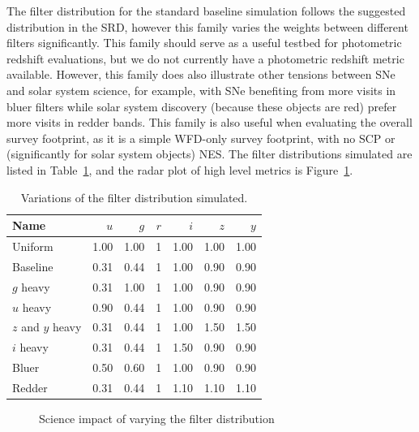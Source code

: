 The filter distribution for the standard baseline simulation follows the suggested distribution in the SRD, however this family varies the weights between different filters significantly. This family should serve as a useful testbed for photometric redshift evaluations, but we do not currently have a photometric redshift metric available. However, this family does also illustrate other tensions between SNe and solar system science, for example, with SNe benefiting from more visits in bluer filters while solar system discovery (because these objects are red) prefer more visits in redder bands. This family is also useful when evaluating the overall survey footprint, as it is a simple WFD-only survey footprint, with no SCP or (significantly for solar system objects) NES. 
The filter distributions simulated are listed in Table~\ref{table:filtdist}, and the radar plot of high level metrics is Figure~\ref{fig:filterdist_radar}. 

\begin{table}
\begin{centering}
\begin{tabular}{lrrrrrr}
              Name &     $u$ &     $g$ &  $r$ &     $i$ &     $z$ &     $y$ \\
\hline
           Uniform & 1.00 & 1.00 &  1 & 1.00 & 1.00 & 1.00 \\
          Baseline & 0.31 & 0.44 &  1 & 1.00 & 0.90 & 0.90 \\
         $g$ heavy & 0.31 & 1.00 &  1 & 1.00 & 0.90 & 0.90 \\
         $u$ heavy & 0.90 & 0.44 &  1 & 1.00 & 0.90 & 0.90 \\
        $z$ and $y$ heavy & 0.31 & 0.44 &  1 & 1.00 & 1.50 & 1.50 \\
         $i$ heavy & 0.31 & 0.44 &  1 & 1.50 & 0.90 & 0.90 \\
             Bluer & 0.50 & 0.60 &  1 & 1.00 & 0.90 & 0.90 \\
            Redder & 0.31 & 0.44 &  1 & 1.10 & 1.10 & 1.10 \\
\hline
\end{tabular}
\caption{Variations of the filter distribution simulated.}\label{table:filtdist}
\end{centering}
\end{table}

\begin{figure}
\caption{Science impact of varying the filter distribution}\label{fig:filterdist_radar}
\end{figure}


